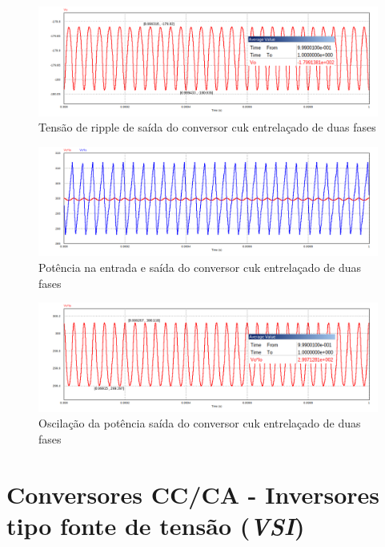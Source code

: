 \documentclass[
	12pt,				%
	openany,
	onseside,
	a4paper,			%
	english,			%
	french,				%
	spanish,			%
	brazil,				%
	]{abntex2}
\begin{document}
\begin{figure}[H]%
	\captionsetup{justification=centering}
	\centering
		\includegraphics[width= \linewidth]{cuk_inter_ripp_V_out}
		\caption{Tensão de ripple de saída do conversor cuk entrelaçado de duas fases}
		\label{fig:cuk_inter_ripp_V_out}
\end{figure}

\begin{figure}[H]%
	\captionsetup{justification=centering}
	\centering
		\includegraphics[width= \linewidth]{cuk_inter_power_sign}
		\caption{Potência na entrada e saída do conversor cuk entrelaçado de duas fases}
		\label{fig:cuk_inter_power_sign}
\end{figure}

\begin{figure}[H]%
	\captionsetup{justification=centering}
	\centering
		\includegraphics[width= \linewidth]{cuk_inter_pow_out}
		\caption{Oscilação da potência saída do conversor cuk entrelaçado de duas fases}
		\label{fig:cuk_inter_power_sign_out}
\end{figure}

\section{Conversores CC/CA - Inversores tipo fonte de tensão (\textit{VSI})}
\end{document}
